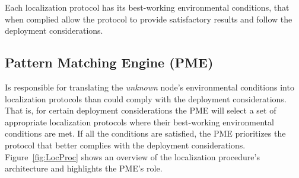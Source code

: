 Each localization protocol has its best-working environmental conditions, that when complied allow the protocol to provide satisfactory results and follow the deployment considerations.


\subsection{Pattern Matching Engine (PME)}\label{PME}
Is responsible for translating the \emph{unknown} node's environmental conditions into localization protocols than could comply with the deployment considerations. That is, for certain deployment considerations the PME will select a set of appropriate localization protocols where their best-working environmental conditions are met. If all the conditions are satisfied, the PME prioritizes the protocol that better complies with the deployment considerations. Figure~\ref{fig:LocProc} shows an overview of the localization procedure's architecture and highlights the PME's role.

